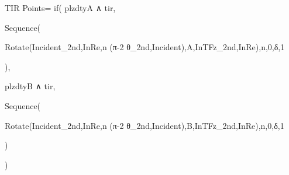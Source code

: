 TIR Points=
  if(
    plzdtyA ∧ tir,

    Sequence(

    Rotate(Incident_{2nd,InRe},n (π-2 θ_{2nd,Incident}),A,InTFz_{2nd,InRe}),n,0,δ,1

    ),

    plzdtyB ∧ tir,

    Sequence(

    Rotate(Incident_{2nd,InRe},n (π-2 θ_{2nd,Incident}),B,InTFz_{2nd,InRe}),n,0,δ,1

    )

  )

  